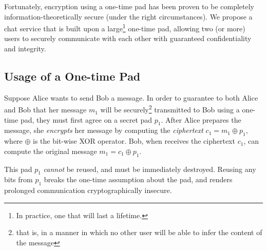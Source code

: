 \documentclass[twocolumn]{article}
\begin{document}
Fortunately, encryption using a one-time pad has been proven to be completely information-theoretically secure (under the right circumstances). We propose a chat service that is built upon a large\footnote{
In practice, one that will last a lifetime.
}
one-time pad, allowing two (or more) users to securely communicate with each other with guaranteed confidentiality and integrity.

\subsection{Usage of a One-time Pad}

Suppose Alice wants to send Bob a message. In order to guarantee to both Alice and Bob that her message $m_1$ will be securely\footnote{
that is, in a manner in which no other user will be able to infer the content of the message
}
transmitted to Bob using a one-time pad, they must first agree on a secret pad $p_{1}$. After Alice prepares the message, she \emph{encrypts} her message by computing the \emph{ciphertext} $c_{1} = m_{1} \oplus p_{1}$, where $\oplus$ is the bit-wise XOR operator. Bob, when receives the ciphertext $c_1$, can compute the original message $m_1 = c_1 \oplus p_1$.

This pad $p_1$ \emph{cannot} be reused, and must be immediately destroyed. Reusing any bits from $p_1$ breaks the one-time assumption about the pad, and renders prolonged communication cryptographically insecure.
\end{document}
